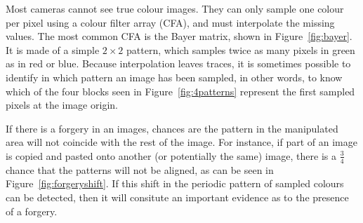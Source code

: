 \documentclass{ipol}
\begin{document}
Most cameras cannot see true colour images. They can only sample one colour per pixel using a colour filter array (CFA), and must interpolate the missing values. The most common CFA is the Bayer matrix, shown in Figure~\ref{fig:bayer}. It is made of a simple $2\times2$ pattern, which samples twice as many pixels in green as in red or blue. Because interpolation leaves traces, it is sometimes possible to identify in which pattern an image has been sampled, in other words, to know which of the four blocks seen in Figure~\ref{fig:4patterns} represent the first sampled pixels at the image origin.

If there is a forgery in an images, chances are the pattern in the manipulated area will not coincide with the rest of the image. For instance, if part of an image is copied and pasted onto another (or potentially the same) image, there is a $\frac34$ chance that the patterns will not be aligned, as can be seen in Figure~\ref{fig:forgeryshift}. If this shift in the periodic pattern of sampled colours can be detected, then it will consitute an important evidence as to the presence of a forgery.
\end{document}
